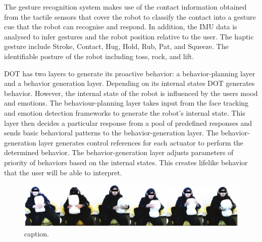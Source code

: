 \documentclass[letterpaper, 10 pt, conference]{ieeeconf}  %
\begin{document}
The gesture recognition system makes use of the contact information obtained from the tactile sensors that cover the robot to classify the contact into a gesture cue that the robot can recognise and respond. In addition, the IMU data is analysed to infer gestures and the robot position relative to the user. The haptic gesture include Stroke, Contact, Hug, Hold, Rub, Pat, and Squeeze. The identifiable posture of the robot including toss, rock, and lift.  

DOT has two layers to generate its proactive behavior: a behavior-planning layer and a behavior generation layer. Depending on its internal states DOT generates behavior. However, the internal state of the robot is influenced by the users mood and emotions. The behaviour-planning layer takes input from the face tracking and emotion detection frameworks to generate the robot's internal state. This layer then decides a particular response from a pool of predefined responses and sends basic behavioral patterns to the behavior-generation layer. The behavior-generation layer generates control references for each actuator to perform the determined behavior. The behavior-generation layer adjusts parameters of priority of behaviors based on the internal states. This creates lifelike behavior that the user will be able to interpret.

\begin{figure}[t!]
\centering
\includegraphics[width=\textwidth]{pilot-data.pdf}
\vskip -10pt
\caption{caption.}
\label{fig:pilot-study}
\end{figure}


\end{document}
